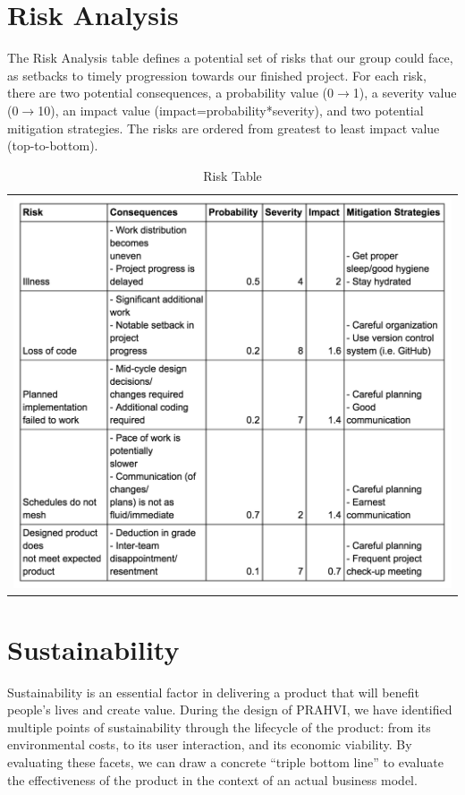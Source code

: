 \chapter{Risk Analysis}
	The Risk Analysis table defines a potential set of risks that our group could face, as setbacks to timely progression towards our finished project. For each risk, there are two potential consequences, a probability value (0$\rightarrow$1), a severity value (0$\rightarrow$10), an impact value (impact=probability*severity), and two potential mitigation strategies. The risks are ordered from greatest to least impact value (top-to-bottom).

\begin{table}[]
\caption{Risk Table}
\label{riskTable}
\begin{tabular}{l}
    \includegraphics[scale = 0.8]{riskTable.png}
\end{tabular}
\end{table}

\chapter{Sustainability}
	Sustainability is an essential factor in delivering a product that will benefit people’s lives and create value. During the design of PRAHVI, we have identified multiple points of sustainability through the lifecycle of the product: from its environmental costs, to its user interaction, and its economic viability. By evaluating these facets, we can draw a concrete “triple bottom line” to evaluate the effectiveness of the product in the context of an actual business model.
	
